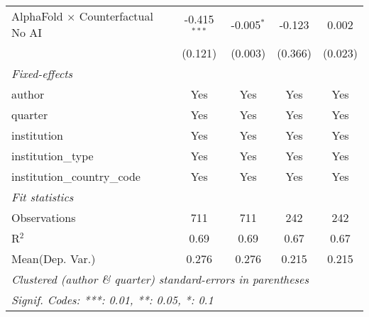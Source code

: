 \begin{tabular}{lcccc}
   AlphaFold $\times$ Counterfactual No AI  & -0.415$^{***}$ & -0.005$^{*}$  & -0.123    & 0.002\\   
                                            & (0.121)        & (0.003)       & (0.366)   & (0.023)\\   
   \midrule
   \emph{Fixed-effects}\\
   author                                   & Yes            & Yes           & Yes       & Yes\\  
   quarter                                  & Yes            & Yes           & Yes       & Yes\\  
   institution                              & Yes            & Yes           & Yes       & Yes\\  
   institution\_type                        & Yes            & Yes           & Yes       & Yes\\  
   institution\_country\_code               & Yes            & Yes           & Yes       & Yes\\  
   \midrule
   \emph{Fit statistics}\\
   Observations                             & 711            & 711           & 242       & 242\\  
   R$^2$                                    & 0.69           & 0.69          & 0.67      & 0.67\\  
Mean(Dep. Var.) & 0.276 & 0.276 & 0.215 & 0.215 \\
   \midrule \midrule
   \multicolumn{5}{l}{\emph{Clustered (author \& quarter) standard-errors in parentheses}}\\
   \multicolumn{5}{l}{\emph{Signif. Codes: ***: 0.01, **: 0.05, *: 0.1}}\\
\end{tabular}
\par\endgroup
